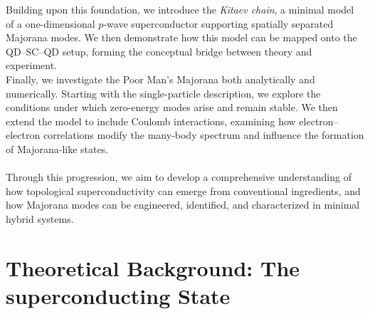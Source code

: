 \documentclass[11pt, letterpaper, titlepage]{article}
\begin{document}
Building upon this foundation, we introduce the \textit{Kitaev chain}, a minimal model of a one-dimensional $p$-wave superconductor supporting spatially separated Majorana modes. We then demonstrate how this model can be mapped onto the QD–SC–QD setup, forming the conceptual bridge between theory and experiment.  \\ 
Finally, we investigate the Poor Man’s Majorana both analytically and numerically. Starting with the single-particle description, we explore the conditions under which zero-energy modes arise and remain stable. We then extend the model to include Coulomb interactions, examining how electron–electron correlations modify the many-body spectrum and influence the formation of Majorana-like states. \\  \\ 
Through this progression, we aim to develop a comprehensive understanding of how topological superconductivity can emerge from conventional ingredients, and how Majorana modes can be engineered, identified, and characterized in minimal hybrid systems.











\section{Theoretical Background: The superconducting State}
\end{document}
